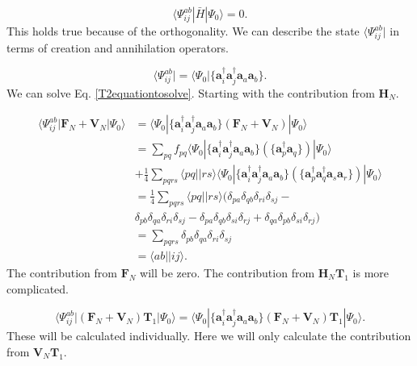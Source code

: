 \begin{equation}
\langle \Psi_{ij}^{ab} | \bar{H} | \Psi_0 \rangle = 0 . \label{T2equationtosolve}
\end{equation}
This holds true because of the orthogonality. We can describe the state $\langle \Psi_{ij}^{ab}|$ in terms of creation and annihilation operators.

\begin{equation}
\langle \Psi_{ij}^{ab}| = \langle \Psi_0 | \{ \textbf{a}^{\dag}_i \textbf{a}^{\dag}_j \textbf{a}_a \textbf{a}_b \} .
\end{equation}
We can solve Eq. \eqref{T2equationtosolve}. Starting with the contribution from $\textbf{H}_N$. 

\begin{align}
\langle \Psi_{ij}^{ab} | \textbf{F}_N + \textbf{V}_N | \Psi_0 \rangle & = 
\langle \Psi_{0} | \{\textbf{a}^{\dag}_i \textbf{a}^{\dag}_j \textbf{a}_a \textbf{a}_b\} \left( \textbf{F}_N + \textbf{V}_N \right) | \Psi_0 \rangle \nonumber \\ &
= \sum_{pq} f_{pq} \langle \Psi_{0} | \{\textbf{a}^{\dag}_i \textbf{a}^{\dag}_j \textbf{a}_a \textbf{a}_b\} \left( \{ \textbf{a}^{\dag}_p \textbf{a}_q \} \right) | \Psi_0 \rangle \nonumber \\ & 
+ \frac{1}{4} \sum_{pqrs} \langle pq || rs \rangle \langle \Psi_{0} | \{\textbf{a}^{\dag}_i \textbf{a}^{\dag}_j \textbf{a}_a \textbf{a}_b\} \left( \{ \textbf{a}^{\dag}_p \textbf{a}^{\dag}_q 
\textbf{a}_s \textbf{a}_r\} \right) | \Psi_0 \rangle \nonumber \\ &
= \frac{1}{4} \sum_{pqrs} \langle pq || rs \rangle
( \delta_{pa} \delta_{qb} \delta_{ri} \delta_{sj} - \nonumber \\ &
\delta_{pb} \delta_{qa} \delta_{ri} \delta_{sj} - 
\delta_{pa} \delta_{qb} \delta_{si} \delta_{rj} +
\delta_{qa} \delta_{pb} \delta_{si} \delta_{rj} ) \nonumber \\ &
= \sum_{pqrs} \delta_{pb} \delta_{qa} \delta_{ri} \delta_{sj} \nonumber \\ &
= \langle ab || ij \rangle .
\end{align}
The contribution from $\textbf{F}_N$ will be zero. The contribution from $\textbf{H}_N \textbf{T}_1$ is more complicated.

\begin{equation}
\langle \Psi_{ij}^{ab} | (\textbf{F}_N + \textbf{V}_N)\textbf{T}_1 | \Psi_0 \rangle = \langle \Psi_{0} | \{\textbf{a}^{\dag}_i \textbf{a}^{\dag}_j \textbf{a}_a \textbf{a}_b\} \left( \textbf{F}_N + \textbf{V}_N \right) \textbf{T}_1 | \Psi_0 \rangle .
\end{equation}
These will be calculated individually. Here we will only calculate the contribution from $\textbf{V}_N \textbf{T}_1$.

